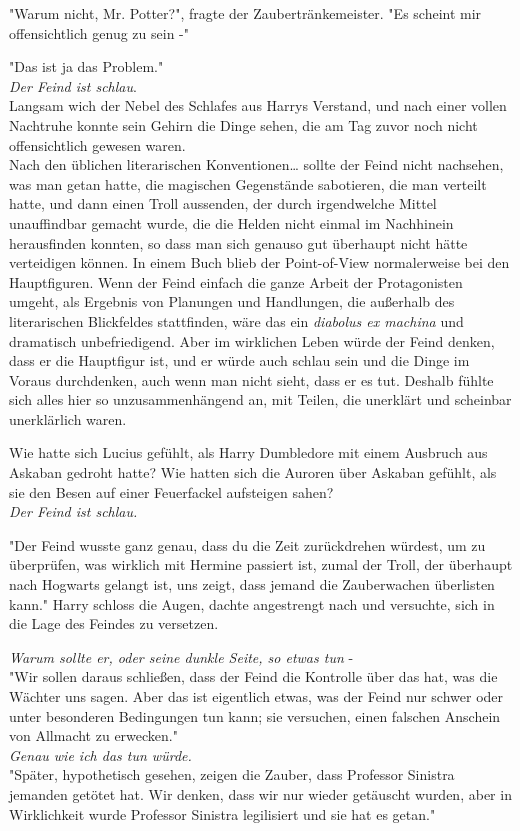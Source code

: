{"Warum nicht, Mr. Potter?", fragte der Zaubertränkemeister. "Es scheint mir offensichtlich genug zu sein -"

"Das ist ja das Problem."\\ \emph{Der Feind ist schlau}.\\ Langsam wich der Nebel des Schlafes aus Harrys Verstand, und nach einer vollen Nachtruhe konnte sein Gehirn die Dinge sehen, die am Tag zuvor noch nicht offensichtlich gewesen waren.\\ Nach den üblichen literarischen Konventionen… sollte der Feind nicht nachsehen, was man getan hatte, die magischen Gegenstände sabotieren, die man verteilt hatte, und dann einen Troll aussenden, der durch irgendwelche Mittel unauffindbar gemacht wurde, die die Helden nicht einmal im Nachhinein herausfinden konnten, so dass man sich genauso gut überhaupt nicht hätte verteidigen können. In einem Buch blieb der Point-of-View normalerweise bei den Hauptfiguren. Wenn der Feind einfach die ganze Arbeit der Protagonisten umgeht, als Ergebnis von Planungen und Handlungen, die außerhalb des literarischen Blickfeldes stattfinden, wäre das ein \emph{diabolus ex machina} und dramatisch unbefriedigend. Aber im wirklichen Leben würde der Feind denken, dass er die Hauptfigur ist, und er würde auch schlau sein und die Dinge im Voraus durchdenken, auch wenn man nicht sieht, dass er es tut. Deshalb fühlte sich alles hier so unzusammenhängend an, mit Teilen, die unerklärt und scheinbar unerklärlich waren.

Wie hatte sich Lucius gefühlt, als Harry Dumbledore mit einem Ausbruch aus Askaban gedroht hatte? Wie hatten sich die Auroren über Askaban gefühlt, als sie den Besen auf einer Feuerfackel aufsteigen sahen?\\ \emph{Der Feind ist schlau.}

"Der Feind wusste ganz genau, dass du die Zeit zurückdrehen würdest, um zu überprüfen, was wirklich mit Hermine passiert ist, zumal der Troll, der überhaupt nach Hogwarts gelangt ist, uns zeigt, dass jemand die Zauberwachen überlisten kann." Harry schloss die Augen, dachte angestrengt nach und versuchte, sich in die Lage des Feindes zu versetzen.

\emph{Warum sollte er, oder seine dunkle Seite, so etwas tun} -\\ "Wir sollen daraus schließen, dass der Feind die Kontrolle über das hat, was die Wächter uns sagen. Aber das ist eigentlich etwas, was der Feind nur schwer oder unter besonderen Bedingungen tun kann; sie versuchen, einen falschen Anschein von Allmacht zu erwecken."\\ \emph{Genau wie ich das tun würde.}\\ "Später, hypothetisch gesehen, zeigen die Zauber, dass Professor Sinistra jemanden getötet hat. Wir denken, dass wir nur wieder getäuscht wurden, aber in Wirklichkeit wurde Professor Sinistra legilisiert und sie hat es getan."

}
